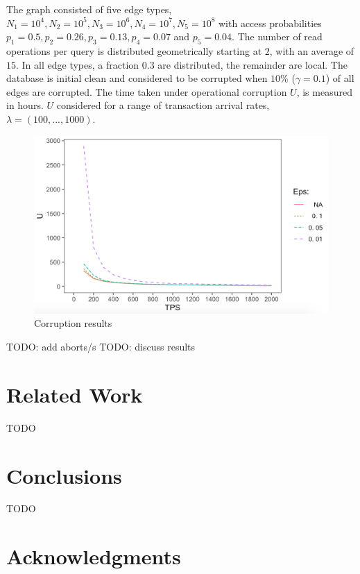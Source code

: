\documentclass[sigplan,10pt]{acmart}
\begin{document}
The graph consisted of five edge types, $N_1=10^4, N_2=10^5, N_3=10^6, N_4=10^7, N_5=10^8$ with access probabilities $p_1 =0.5, p_2 =0.26, p_3=0.13, p_4=0.07$ and $p_5 =0.04$. The number of read operations per query is distributed geometrically starting at $2$, with an average of $15$. In all edge types, a fraction $0.3$ are distributed, the remainder are local. The database is initial clean and considered to be corrupted when $10$\% ($\gamma = 0.1$) of all edges are corrupted. The time taken under operational corruption $U$, is measured in hours. $U$ considered for a range of transaction arrival rates, $\lambda = (100, ..., 1000)$.

\begin{figure}[h]
  \centering
  \includegraphics[width=\linewidth]{./images/results}
  \caption{Corruption results}
  \label{results}
\end{figure}

TODO: add aborts/s
TODO: discuss results

\section{Related Work}

TODO

\section{Conclusions}

TODO

\section{Acknowledgments}
\end{document}
